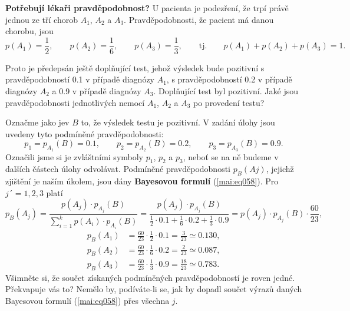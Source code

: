 \wikitextrule
\begin{example}\label{mai:exam061}
  \textbf{Potřebují lékaři pravděpodobnost?}\newline\small
  U pacienta je podezření, že trpí právě jednou ze tří chorob \(A_1\), \(A_2\) a \(A_3\). 
  Pravděpodobnosti, že pacient má danou chorobu, jsou
  \begin{equation*}
    p(A_1) = \frac{1}{2},\qquad p(A_2) = \frac{1}{6},\qquad p(A_3) = \frac{1}{3}, \qquad
    \text{tj.}\qquad p(A_1) + p(A_2) + p(A_3) = 1.
  \end{equation*}
  
  Proto je předepsán ještě doplňující test, jehož výsledek bude pozitivní s pravděpodobností 
  \num{0.1} v případě diagnózy \(A_1\), s pravděpodobností \num{0.2} v případě diagnózy \(A_2\) a 
  \num{0.9} v případě diagnózy \(A_3\). Doplňující test byl pozitivní. Jaké jsou pravděpodobnosti 
  jednotlivých nemocí \(A_1\), \(A_2\) a \(A_3\) po provedení testu?

  Označme jako jev \(B\) to, že výsledek testu je pozitivní. V zadání úlohy jsou uvedeny tyto 
  podmíněné pravděpodobnosti:
  \begin{equation*}
    p_1 = p_{A_1}(B) = \num{0.1}, \qquad p_2 = p_{A_2}(B) = \num{0.2}, \qquad 
    p_3 = p_{A_3}(B) = \num{0.9}.
  \end{equation*}
  Označili jsme si je zvláštními symboly \(p_1\), \(p_2\) a \(p_3\), neboť se na ně budeme v 
  dalších částech úlohy odvolávat. Podmíněné pravděpodobnosti \(p_B(Aj)\), jejichž zjištění je 
  naším úkolem, jsou dány \textbf{Bayesovou formulí} (\ref{mai:eq058}). Pro \(j´= 1, 2, 3\) platí
  \begin{equation*}
    p_B(A_j) = \dfrac{p(A_j)\cdot p_{A_j}(B)}{\sum_{i=1}^{k}p(A_i)\cdot p_{A_i}(B)}  
             = \dfrac{p(A_j)\cdot p_{A_j}(B)}{\frac{1}{2}\cdot\num{0.1} + 
                                              \frac{1}{6}\cdot\num{0.2} + 
                                              \frac{1}{3}\cdot\num{0.9}}
             = p(A_j)\cdot p_{A_j}(B)\cdot\frac{60}{23},
  \end{equation*}
  \begin{align*}
    p_B(A_1) &= \frac{60}{23} \cdot\frac{1}{2}\cdot\num{0.1} =\frac{3}{23}\simeq\num{0.130},     \\
    p_B(A_2) &= \frac{60}{23} \cdot\frac{1}{6}\cdot\num{0.2} =\frac{2}{23}\simeq\num{0.087},     \\
    p_B(A_3) &= \frac{60}{23} \cdot\frac{1}{3}\cdot\num{0.9} =\frac{18}{23}\simeq\num{0.783}.
  \end{align*}
  Všimněte si, že součet získaných podmíněných pravděpodobností je roven jedné. Překvapuje vás to? 
  Nemělo by, podíváte-li se, jak by dopadl součet výrazů daných Bayesovou formulí (\ref{mai:eq058}) 
  přes všechna \(j\).
  

\end{example}

